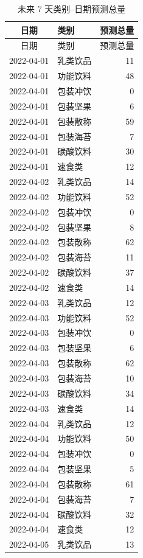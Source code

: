\begingroup
\small
\begin{longtable}{clr}
\caption{未来 7 天类别--日期预测总量}\\
\toprule
日期 & 类别 & 预测总量 \\
\midrule
\endfirsthead
\toprule
日期 & 类别 & 预测总量 \\
\midrule
\endhead
2022-04-01 & 乳类饮品 & 11 \\
2022-04-01 & 功能饮料 & 48 \\
2022-04-01 & 包装冲饮 & 0 \\
2022-04-01 & 包装坚果 & 6 \\
2022-04-01 & 包装散称 & 59 \\
2022-04-01 & 包装海苔 & 7 \\
2022-04-01 & 碳酸饮料 & 30 \\
2022-04-01 & 速食类 & 12 \\
2022-04-02 & 乳类饮品 & 14 \\
2022-04-02 & 功能饮料 & 52 \\
2022-04-02 & 包装冲饮 & 0 \\
2022-04-02 & 包装坚果 & 8 \\
2022-04-02 & 包装散称 & 62 \\
2022-04-02 & 包装海苔 & 11 \\
2022-04-02 & 碳酸饮料 & 37 \\
2022-04-02 & 速食类 & 14 \\
2022-04-03 & 乳类饮品 & 12 \\
2022-04-03 & 功能饮料 & 52 \\
2022-04-03 & 包装冲饮 & 0 \\
2022-04-03 & 包装坚果 & 6 \\
2022-04-03 & 包装散称 & 62 \\
2022-04-03 & 包装海苔 & 10 \\
2022-04-03 & 碳酸饮料 & 34 \\
2022-04-03 & 速食类 & 14 \\
2022-04-04 & 乳类饮品 & 12 \\
2022-04-04 & 功能饮料 & 50 \\
2022-04-04 & 包装冲饮 & 0 \\
2022-04-04 & 包装坚果 & 5 \\
2022-04-04 & 包装散称 & 61 \\
2022-04-04 & 包装海苔 & 7 \\
2022-04-04 & 碳酸饮料 & 32 \\
2022-04-04 & 速食类 & 12 \\
2022-04-05 & 乳类饮品 & 13 \\

\end{longtable}
